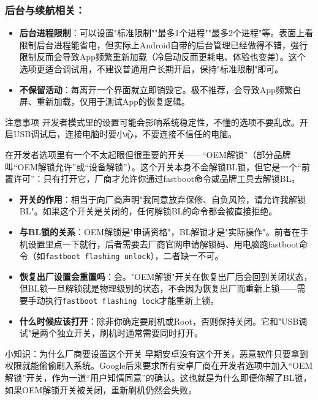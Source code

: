 \subsubsection*{后台与续航相关：}

\begin{itemize}
  \item \textbf{后台进程限制}：可以设置"标准限制""最多1个进程""最多2个进程"等。表面上看限制后台进程能省电，但实际上Android自带的后台管理已经做得不错，强行限制反而会导致App频繁重新加载（冷启动反而更耗电、体验也变差）。这个选项更适合调试用，不建议普通用户长期开启，保持"标准限制"即可。
  \item \textbf{不保留活动}：每离开一个界面就立即销毁它。极不推荐，会导致App频繁白屏、重新加载，仅用于测试App的恢复逻辑。
\end{itemize}

\begin{tcbwarn}{注意事项}
开发者模式里的设置可能会影响系统稳定性，不懂的选项不要乱改。开启USB调试后，连接电脑时要小心，不要连接不信任的电脑。

\end{tcbwarn}


在开发者选项里有一个不太起眼但很重要的开关——“OEM解锁”（部分品牌叫“OEM解锁允许”或“设备解锁”）。这个开关本身不会解锁BL锁，但它是一个“前置许可”：只有打开它，厂商才允许你通过fastboot命令或品牌工具去解锁BL。

\begin{itemize}
  \item \textbf{开关的作用}：相当于向厂商声明"我同意放弃保修、自负风险，请允许我解锁BL"。如果这个开关是关闭的，任何解锁BL的命令都会被直接拒绝。
  \item \textbf{与BL锁的关系}：OEM解锁是"申请资格"，BL解锁才是"实际操作"。前者在手机设置里点一下就行，后者需要去厂商官网申请解锁码、用电脑跑fastboot命令（如\texttt{fastboot flashing unlock}），二者缺一不可。
  \item \textbf{恢复出厂设置会重置吗}：会。"OEM解锁"开关在恢复出厂后会回到关闭状态，但BL锁一旦解锁就是物理级别的状态，不会因为恢复出厂而重新上锁——需要手动执行\texttt{fastboot flashing lock}才能重新上锁。
  \item \textbf{什么时候应该打开}：除非你确定要刷机或Root，否则保持关闭。它和"USB调试"是两个独立开关，刷机时通常需要同时打开。
\end{itemize}

\begin{tcbinfo}{小知识：为什么厂商要设置这个开关}
早期安卓没有这个开关，恶意软件只要拿到权限就能偷偷刷入系统。Google后来要求所有安卓厂商在开发者选项中加入“OEM解锁”开关，作为一道“用户知情同意”的确认。这也就是为什么即便你解了BL锁，如果OEM解锁开关被关闭，重新刷机仍然会失败。

\end{tcbinfo}

